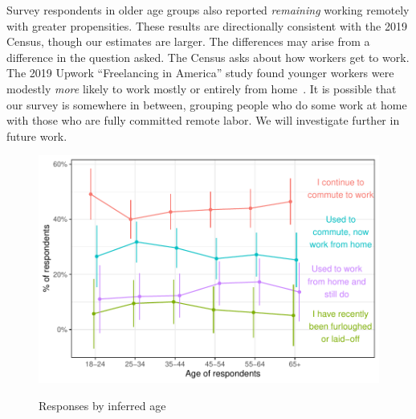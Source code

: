 \documentclass[12pt]{article}
\begin{document}
Survey respondents in older age groups also reported \emph{remaining} working remotely with greater propensities.
These results are directionally consistent with the 2019 Census, though our estimates are larger.
The differences may arise from a difference in the question asked.
The Census asks about how workers get to work. The 2019 Upwork ``Freelancing in America'' study found younger workers were modestly \emph{more} likely to work mostly or entirely from home~\cite{upwork2019}.
It is possible that our survey is somewhere in between, grouping people who do some work at home with those who are fully committed remote labor.
We will investigate further in future work.

\begin{figure}
  \caption{Responses by inferred age} \label{fig:by_age}
\centering
\begin{minipage}{1.0 \linewidth}
  \includegraphics[width = \linewidth]{plots/by_age.pdf} \\
  \begin{footnotesize}
    \begin{singlespace}
    \end{singlespace}
    \end{footnotesize}
\end{minipage}
\end{figure} 


\end{document}
